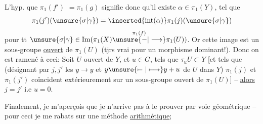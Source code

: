 L'hyp. que $\pi_1(f')$  $=\pi_1(g)$ signifie donc qu'il existe $\alpha\in\pi_1(Y)$, tel que
\[
\pi_1(j')(\unsure{\sigma|\gamma})=\inserted{\operatorname{int}(\alpha)}\pi_1(j)(\unsure{\sigma|\gamma})
\]
pour tt $\unsure{\sigma|\gamma}\in\operatorname{Im}(\pi_1(X)\overset{\pi_1(f)}{\unsure{-|\longrightarrow}}\pi_1(U))$. Or cette image est un sous-groupe \uline{ouvert} de $\pi_1(U)$ (tjrs vrai pour un morphisme dominant!).  Donc on est ramené à ceci: Soit $U$ ouvert \inserted{$\ne\varnothing$} de $Y$, et $u\in G$, tels que $\tau_uU\subset Y$ [et tels que (désignant par $j,j'$ les   $y\longrightarrow y$ et $y\unsure{\mapstochar\relbar|\longmapsto}y+u$ de $U$ dans $Y$) $\pi_1(j)$ et $\pi_1(j')$ coïncident extérieurement sur un sous-groupe ouvert de $\pi_1(U)$] -- \uline{alors} $j=j'$ i.e $u=0$.


Finalement, je m'aperçois que je n'arrive pas à le prouver par voie géométrique -- pour ceci je me rabats sur une méthode \uline{arithmétique};

